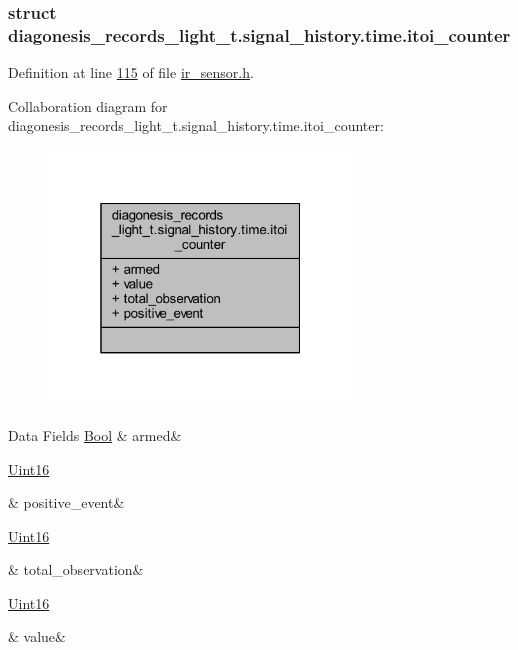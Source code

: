 \subsubsection{struct diagonesis\+\_\+records\+\_\+light\+\_\+t.\+signal\+\_\+history.\+time.\+itoi\+\_\+counter}


Definition at line \hyperlink{a00017_source_l00115}{115} of file \hyperlink{a00017_source}{ir\+\_\+sensor.\+h}.



Collaboration diagram for diagonesis\+\_\+records\+\_\+light\+\_\+t.\+signal\+\_\+history.\+time.\+itoi\+\_\+counter\+:\nopagebreak
\begin{figure}[H]
\begin{center}
\leavevmode
\includegraphics[width=229pt]{dd/d98/a00927}
\end{center}
\end{figure}
\begin{DoxyFields}{Data Fields}
\hypertarget{a00017_a6e0c631e86ef2402cfa1ca3608a5123e}{\hyperlink{a00072_a253b248072cfc8bd812c69acd0046eed}{Bool}}\label{a00017_a6e0c631e86ef2402cfa1ca3608a5123e}
&
armed&
\\
\hline

\hypertarget{a00017_adbe1997e7299ac5c071335ca91579447}{\hyperlink{a00072_a59a9f6be4562c327cbfb4f7e8e18f08b}{Uint16}}\label{a00017_adbe1997e7299ac5c071335ca91579447}
&
positive\+\_\+event&
\\
\hline

\hypertarget{a00017_a5c752d693b04fadbacceeaffb3adf49a}{\hyperlink{a00072_a59a9f6be4562c327cbfb4f7e8e18f08b}{Uint16}}\label{a00017_a5c752d693b04fadbacceeaffb3adf49a}
&
total\+\_\+observation&
\\
\hline

\hypertarget{a00017_a2063c1608d6e0baf80249c42e2be5804}{\hyperlink{a00072_a59a9f6be4562c327cbfb4f7e8e18f08b}{Uint16}}\label{a00017_a2063c1608d6e0baf80249c42e2be5804}
&
value&
\\
\hline

\end{DoxyFields}
\label{d6/db8/a00376}
\hypertarget{a00017_d6/db8/a00376}{}
